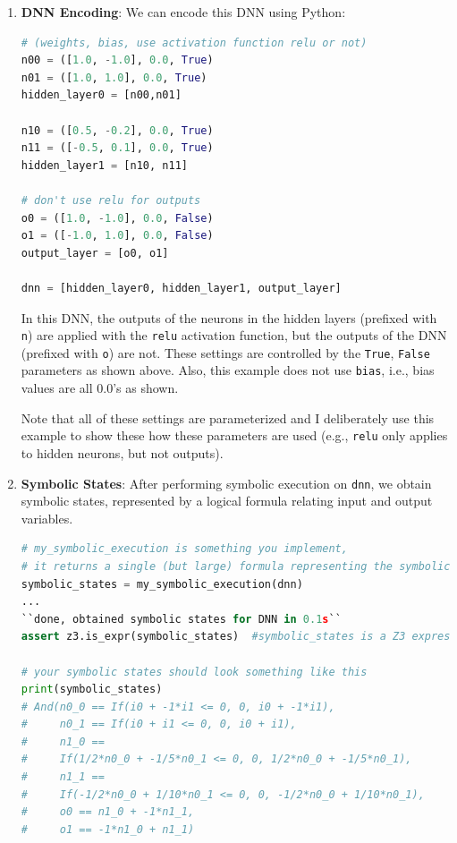 \begin{enumerate}[label=\arabic*.]
\item \textbf{DNN Encoding}: We can encode this DNN using Python:

\begin{lstlisting}[language=Python]
# (weights, bias, use activation function relu or not)
n00 = ([1.0, -1.0], 0.0, True)
n01 = ([1.0, 1.0], 0.0, True)
hidden_layer0 = [n00,n01]

n10 = ([0.5, -0.2], 0.0, True)
n11 = ([-0.5, 0.1], 0.0, True)
hidden_layer1 = [n10, n11]

# don't use relu for outputs
o0 = ([1.0, -1.0], 0.0, False)  
o1 = ([-1.0, 1.0], 0.0, False)
output_layer = [o0, o1]

dnn = [hidden_layer0, hidden_layer1, output_layer]
\end{lstlisting}

In this DNN, the outputs of the neurons in the hidden layers (prefixed with \texttt{n}) are applied with the \texttt{relu} activation function, but the outputs of the DNN (prefixed with \texttt{o}) are not.  These settings are controlled by the \texttt{True}, \texttt{False} parameters as shown above.  Also, this example does not use \texttt{bias}, i.e., bias values are all 0.0's as shown. 

Note that all of these settings are parameterized and I deliberately use this example to show these how these parameters are used (e.g., \texttt{relu} only applies to hidden neurons, but not outputs).

\item \textbf{Symbolic States}: After performing symbolic execution on \texttt{dnn}, we obtain symbolic states, represented by a logical formula relating input and output variables.

\begin{lstlisting}[language=Python]
# my_symbolic_execution is something you implement,
# it returns a single (but large) formula representing the symbolic states.
symbolic_states = my_symbolic_execution(dnn)
...
``done, obtained symbolic states for DNN in 0.1s``
assert z3.is_expr(symbolic_states)  #symbolic_states is a Z3 expression

# your symbolic states should look something like this
print(symbolic_states)   
# And(n0_0 == If(i0 + -1*i1 <= 0, 0, i0 + -1*i1),
#     n0_1 == If(i0 + i1 <= 0, 0, i0 + i1),
#     n1_0 ==
#     If(1/2*n0_0 + -1/5*n0_1 <= 0, 0, 1/2*n0_0 + -1/5*n0_1),
#     n1_1 ==
#     If(-1/2*n0_0 + 1/10*n0_1 <= 0, 0, -1/2*n0_0 + 1/10*n0_1),
#     o0 == n1_0 + -1*n1_1,
#     o1 == -1*n1_0 + n1_1)
\end{lstlisting}


\end{enumerate}
